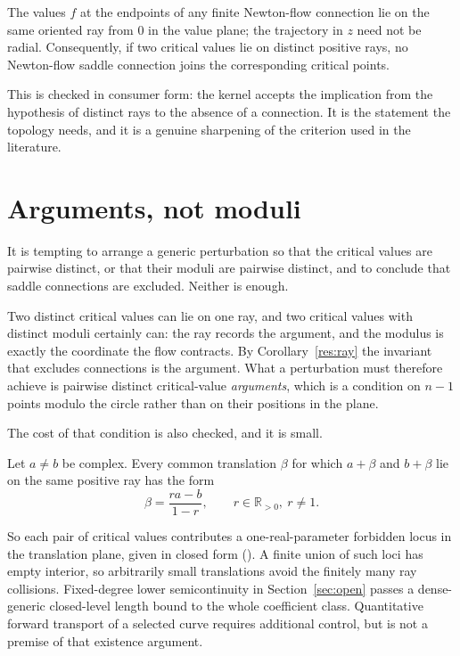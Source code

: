 \documentclass[11pt]{article}
\newcommand{\pdecl}[1]{\emph{\leanlabel{#1}}}
\begin{document}
\begin{corollary}\label{res:ray}
The values $f$ at the endpoints of any finite Newton-flow connection lie on
the same oriented ray from $0$ in the value plane; the trajectory in $z$ need
not be radial.  Consequently, if two critical values lie on distinct positive
rays, no Newton-flow saddle connection joins the corresponding critical points.
\end{corollary}

\noindent This is checked in consumer form: the kernel accepts the implication
from the hypothesis of distinct rays to the absence of a connection.  It is the
statement the topology needs, and it is a genuine sharpening of the criterion
used in the literature.

\section{Arguments, not moduli}\label{sec:arguments}

It is tempting to arrange a generic perturbation so that the critical values
are pairwise distinct, or that their moduli are pairwise distinct, and to
conclude that saddle connections are excluded.  Neither is enough.

Two distinct critical values can lie on one ray, and two critical values with
distinct moduli certainly can: the ray records the argument, and the modulus is
exactly the coordinate the flow contracts.  By Corollary~\ref{res:ray} the
invariant that excludes connections is the argument.  What a perturbation must
therefore achieve is pairwise distinct critical-value \emph{arguments}, which is
a condition on $n-1$ points modulo the circle rather than on their positions in
the plane.

The cost of that condition is also checked, and it is small.

\begin{theorem}\label{res:locus}
Let $a\ne b$ be complex.  Every common translation $\beta$ for which $a+\beta$
and $b+\beta$ lie on the same positive ray has the form
\[
  \beta=\frac{ra-b}{1-r},
  \qquad r\in\mathbb{R}_{>0},\ r\ne1 .
\]
\end{theorem}

\noindent So each pair of critical values contributes a one-real-parameter
forbidden locus in the translation plane, given in closed form
(\pdecl{translated_samePositiveRay_parameterization}).  A finite union of such
loci has empty interior, so arbitrarily small translations avoid the
finitely many ray collisions.  Fixed-degree lower semicontinuity in
Section~\ref{sec:open} passes a dense-generic closed-level length bound to the
whole coefficient class.  Quantitative forward transport of a selected curve
requires additional control, but is not a premise of that existence argument.
\end{document}
